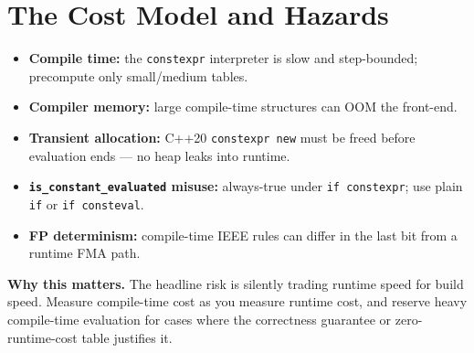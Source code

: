 \section{The Cost Model and Hazards}
\begin{itemize}
\item \textbf{Compile time:} the \texttt{constexpr} interpreter is slow and step-bounded; precompute only small/medium tables.
\item \textbf{Compiler memory:} large compile-time structures can OOM the front-end.
\item \textbf{Transient allocation:} C++20 \texttt{constexpr new} must be freed before evaluation ends --- no heap leaks into runtime.
\item \textbf{\texttt{is\_constant\_evaluated} misuse:} always-true under \texttt{if constexpr}; use plain \texttt{if} or \texttt{if consteval}.
\item \textbf{FP determinism:} compile-time IEEE rules can differ in the last bit from a runtime FMA path.
\end{itemize}

\textbf{Why this matters.} The headline risk is silently trading runtime speed for build speed. Measure compile-time cost as you measure runtime cost, and reserve heavy compile-time evaluation for cases where the correctness guarantee or zero-runtime-cost table justifies it.
